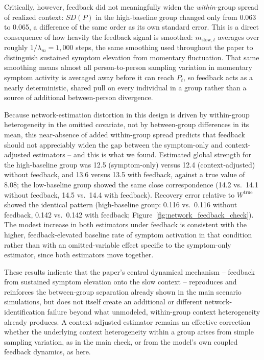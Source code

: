 Critically, however, feedback did not meaningfully widen the \emph{within}-group spread of realized context: $SD(P)$ in the high-baseline group changed only from 0.063 to 0.065, a difference of the same order as its own standard error. This is a direct consequence of how heavily the feedback signal is smoothed: $m_{\text{slow},t}$ averages over roughly $1/\lambda_m = 1{,}000$ steps, the same smoothing used throughout the paper to distinguish sustained symptom elevation from momentary fluctuation. That same smoothing means almost all person-to-person sampling variation in momentary symptom activity is averaged away before it can reach $P_t$, so feedback acts as a nearly deterministic, shared pull on every individual in a group rather than a source of additional between-person divergence.

Because network-estimation distortion in this design is driven by within-group heterogeneity in the omitted covariate, not by between-group differences in its mean, this near-absence of added within-group spread predicts that feedback should not appreciably widen the gap between the symptom-only and context-adjusted estimators -- and this is what we found. Estimated global strength for the high-baseline group was 12.5 (symptom-only) versus 12.4 (context-adjusted) without feedback, and 13.6 versus 13.5 with feedback, against a true value of 8.08; the low-baseline group showed the same close correspondence (14.2 vs.\ 14.1 without feedback, 14.5 vs.\ 14.4 with feedback). Recovery error relative to $W^{\mathrm{true}}$ showed the identical pattern (high-baseline group: 0.116 vs.\ 0.116 without feedback, 0.142 vs.\ 0.142 with feedback; Figure~\ref{fig:network_feedback_check}). The modest increase in both estimators under feedback is consistent with the higher, feedback-elevated baseline rate of symptom activation in that condition rather than with an omitted-variable effect specific to the symptom-only estimator, since both estimators move together.

These results indicate that the paper's central dynamical mechanism -- feedback from sustained symptom elevation onto the slow context -- reproduces and reinforces the between-group separation already shown in the main scenario simulations, but does not itself create an additional or different network-identification failure beyond what unmodeled, within-group context heterogeneity already produces. A context-adjusted estimator remains an effective correction whether the underlying context heterogeneity within a group arises from simple sampling variation, as in the main check, or from the model's own coupled feedback dynamics, as here.


